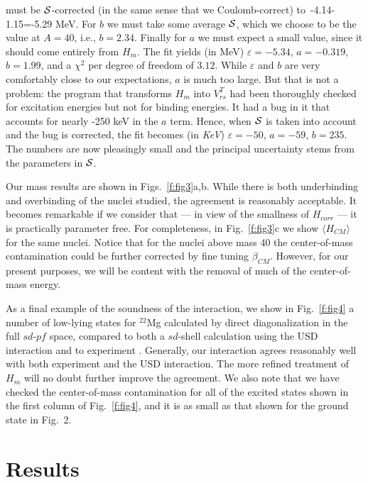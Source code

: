 \begin{multicols}{2}
must be ${\cal S}$-corrected (in the same sense that we
Coulomb-correct) to\  -4.14-1.15=-5.29 MeV.  For $b$ we must take some
average ${\cal S}$, which we choose to be the value at $A=40$, i.e.,
$b=2.34$. Finally for $a$ we must expect a small value, since it
should come entirely from $H_m$. The fit yields
(in MeV)  $\varepsilon=-5.34$, $a=-0.319$, $b=1.99$, and a
$\chi^2$ per degree of freedom of $3.12$. While $\varepsilon$ and $b$
are very comfortably close to our expectations, $a$ is much too
large. But that is not a problem: the program that transforms $H_m$
into $V_{rs}^T$ had been thoroughly checked for excitation energies
but not for binding energies. It had a
bug in it that accounts for nearly -250 keV in
the $a$ term. Hence, when ${\cal S}$ is taken into account and
the bug is corrected, the fit becomes
(in {\em KeV}) $\varepsilon=-50$, $a=-59$, $b=235$. The numbers are
now pleasingly small and the principal uncertainty stems from the
parameters in ${\cal S}$.

Our mass results are shown in
Figs.~\ref{f:fig3}a,b. While there is both underbinding and overbinding
of the nuclei studied, the agreement is reasonably acceptable. It
becomes remarkable if we consider that --- in view of the smallness of
$H_{corr}$ --- it is practically parameter free.
For completeness, in Fig.~\ref{f:fig3}c we show
$\langle  H_{CM} \rangle$ for the same nuclei. Notice that for the nuclei
above mass 40 the center-of-mass contamination could be further corrected
by fine tuning $\beta_{CM}$. However, for our present purposes, we will
be content with the removal of much of the center-of-mass energy.

As a final example of the soundness of the interaction, we show in
Fig.~\ref{f:fig4} a number of low-lying states for $^{22}$Mg
calculated by direct diagonalization  in the
full $sd$-$pf$ space, compared to both a $sd$-shell calculation using
the USD interaction and to experiment \cite{r:ensdf}.  Generally, our
interaction agrees reasonably well with both experiment and the USD
interaction. The more refined treatment of $H_m$ will no doubt further
improve the agreement.  We also note that we have checked
the center-of-mass contamination for all of the excited states shown in
the first column of Fig.~\ref{f:fig4}, and it is as small as that
shown for the ground state in Fig.~2.

\section{Results}


\end{multicols}
